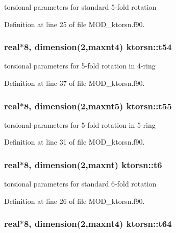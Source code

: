 torsional parameters for standard 5-\/fold rotation 



Definition at line 25 of file M\-O\-D\-\_\-ktorsn.\-f90.

\hypertarget{classktorsn_a9af7f060836dfcf31560112cc0bb9ee6}{
\subsubsection[{t54}]{\setlength{\rightskip}{0pt plus 5cm}real$\ast$8, dimension(2,{\bf maxnt4}) ktorsn\-::t54}}\label{classktorsn_a9af7f060836dfcf31560112cc0bb9ee6}


torsional parameters for 5-\/fold rotation in 4-\/ring 



Definition at line 37 of file M\-O\-D\-\_\-ktorsn.\-f90.

\hypertarget{classktorsn_a555cbb3dd71f3c017278e95f991e15c7}{
\subsubsection[{t55}]{\setlength{\rightskip}{0pt plus 5cm}real$\ast$8, dimension(2,{\bf maxnt5}) ktorsn\-::t55}}\label{classktorsn_a555cbb3dd71f3c017278e95f991e15c7}


torsional parameters for 5-\/fold rotation in 5-\/ring 



Definition at line 31 of file M\-O\-D\-\_\-ktorsn.\-f90.

\hypertarget{classktorsn_a3783e6c4f7c898032137ce4ba2fb0fbe}{
\subsubsection[{t6}]{\setlength{\rightskip}{0pt plus 5cm}real$\ast$8, dimension(2,{\bf maxnt}) ktorsn\-::t6}}\label{classktorsn_a3783e6c4f7c898032137ce4ba2fb0fbe}


torsional parameters for standard 6-\/fold rotation 



Definition at line 26 of file M\-O\-D\-\_\-ktorsn.\-f90.

\hypertarget{classktorsn_ae19a13b15f2efafe900c71cff043544f}{
\subsubsection[{t64}]{\setlength{\rightskip}{0pt plus 5cm}real$\ast$8, dimension(2,{\bf maxnt4}) ktorsn\-::t64}}\label{classktorsn_ae19a13b15f2efafe900c71cff043544f}


